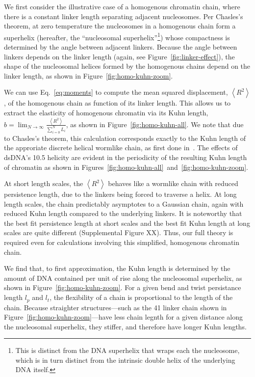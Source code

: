 \documentclass[%
 reprint,
superscriptaddress,
showpacs,preprintnumbers,
 amsmath,amssymb,
 aps,
 prl,
]{revtex4-1}
\newcommand{\RR}{\left\langle{}R^2\right\rangle{}}
\begin{document}
We first consider the illustrative case of a homogenous chromatin chain, where
    there is a constant linker length separating adjacent nucleosomes.
Per Chasles's theorem, at zero temperature the nucleosomes in a homogenous chain
    form a superhelix (hereafter, the ``nucleosomal superhelix''\footnote{%
        This is distinct from the DNA superhelix that wraps each the nucleosome,
        which is in turn distinct from the intrinsic double helix of the
        underlying DNA itself.})
    whose compactness is determined by the angle between adjacent linkers.
Because the angle between linkers depends on the linker length (again, see
    Figure~\ref{fig:linker-effect}), the shape of the nucleosomal helices formed by
    the homogenous chains depend on the linker length, as shown in
    Figure~\ref{fig:homo-kuhn-zoom}.

We can use Eq.~\ref{eq:moments} to compute the mean squared displacement, $\RR$,
    of the homogenous chain as function of its linker length.
This allows us to extract the elasticity of homogenous chromatin via its Kuhn
    length, $b = \lim_{N\to\infty} \frac{\RR}{\sum_{i=0}^N L_i}$, as shown in
    Figure~\ref{fig:homo-kuhn-all}.
We note that due to Chasles's theorem, this calculation corresponds exactly to
    the Kuhn length of the approriate discrete helical wormlike chain, as first
    done in~\cite{yamakawa1976}.
The effects of dsDNA's \SI{10.5}{\basepair} helicity are evident in the
    periodicity of the resulting Kuhn length of chromatin as shown in
    Figures~\ref{fig:homo-kuhn-all}~and~\ref{fig:homo-kuhn-zoom}.

At short length scales, the $\RR$ behaves like a wormlike chain with reduced
    persistence length, due to the linkers being forced to traverse a helix.
At long length scales, the chain predictably asymptotes to a Gaussian
    chain, again with reduced Kuhn length compared to the underlying linkers.
It is noteworthy that the best fit persistence length at short scales and the
    best fit Kuhn length at long scales are quite different (Supplemental Figure
    XX).
Thus, our full theory is required even for calculations involving this
    simplified, homogenous chromatin chain.

We find that, to first approximation, the Kuhn length is determined by the
    amount of DNA contained per unit of rise along the nucleosomal superhelix,
    as shown in Figure~\ref{fig:homo-kuhn-zoom}.
For a given bend and twist persistance length $l_p$ and $l_t$, the flexibility
    of a chain is proportional to the length of the chain.
Because straighter structures---such as the \SI{41}{\basepair} linker chain
    shown in Figure~\ref{fig:homo-kuhn-zoom}---have less chain legnth for a
    given distance along  the nucleosomal superhelix, they stiffer, and
    therefore have longer Kuhn lengths.
\end{document}
